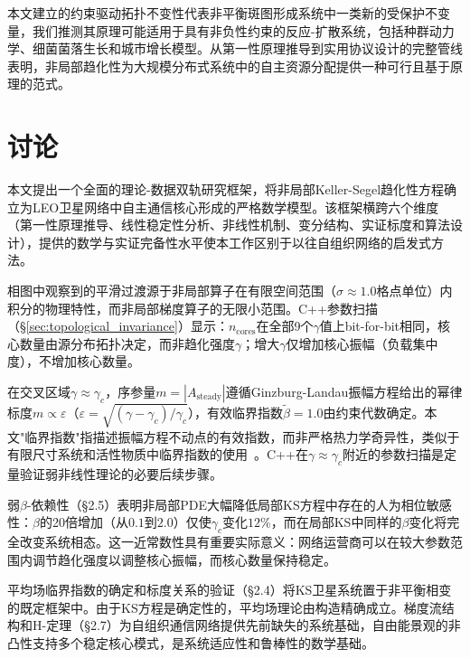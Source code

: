 \documentclass[sn-nature,pdflatex]{sn-jnl}
\begin{document}
本文建立的约束驱动拓扑不变性代表非平衡斑图形成系统中一类新的受保护不变量，我们推测其原理可能适用于具有非负性约束的反应-扩散系统，包括种群动力学、细菌菌落生长和城市增长模型。从第一性原理推导到实用协议设计的完整管线表明，非局部趋化性为大规模分布式系统中的自主资源分配提供一种可行且基于原理的范式。

\section{讨论}

本文提出一个全面的理论-数据双轨研究框架，将非局部Keller-Segel趋化性方程确立为LEO卫星网络中自主通信核心形成的严格数学模型。该框架横跨六个维度（第一性原理推导、线性稳定性分析、非线性机制、变分结构、实证标度和算法设计），提供的数学与实证完备性水平使本工作区别于以往自组织网络的启发式方法。

相图中观察到的平滑过渡源于非局部算子在有限空间范围（$\sigma \approx 1.0$格点单位）内积分的物理特性，而非局部梯度算子的无限小范围。C++参数扫描（§\ref{sec:topological_invariance}）显示：$n_{\text{cores}}$在全部9个$\gamma$值上bit-for-bit相同，核心数量由源分布拓扑决定，而非趋化强度$\gamma$；增大$\gamma$仅增加核心振幅（负载集中度），不增加核心数量。

在交叉区域$\gamma \approx \gamma_c$，序参量$m = |A_{\text{steady}}|$遵循Ginzburg-Landau振幅方程给出的幂律标度$m \propto \varepsilon$（$\varepsilon = \sqrt{(\gamma-\gamma_c)/\gamma_c}$），有效临界指数$\tilde{\beta}=1.0$由约束代数确定。本文"临界指数"指描述振幅方程不动点的有效指数，而非严格热力学奇异性，类似于有限尺寸系统和活性物质中临界指数的使用~\cite{strogatz_2001}。C++在$\gamma \approx \gamma_c$附近的参数扫描是定量验证弱非线性理论的必要后续步骤。

弱$\beta$-依赖性（§2.5）表明非局部PDE大幅降低局部KS方程中存在的人为相位敏感性：$\beta$的20倍增加（从$0.1$到$2.0$）仅使$\gamma_c$变化$12\%$，而在局部KS中同样的$\beta$变化将完全改变系统相态。这一近常数性具有重要实际意义：网络运营商可以在较大参数范围内调节趋化强度以调整核心振幅，而核心数量保持稳定。

平均场临界指数的确定和标度关系的验证（§2.4）将KS卫星系统置于非平衡相变的既定框架中。由于KS方程是确定性的，平均场理论由构造精确成立。梯度流结构和H-定理（§2.7）为自组织通信网络提供先前缺失的系统基础，自由能景观的非凸性支持多个稳定核心模式，是系统适应性和鲁棒性的数学基础。
\end{document}
